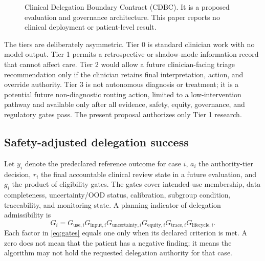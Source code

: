 \documentclass[conference]{IEEEtran}
\begin{document}
\begin{figure}[t]
\centering
{}
\caption{Clinical Delegation Boundary Contract (CDBC). It is a proposed evaluation and governance architecture. This paper reports no clinical deployment or patient-level result.}
\label{fig:cdbc}
\end{figure}

The tiers are deliberately asymmetric. Tier 0 is standard clinician work with no model output. Tier 1 permits a retrospective or shadow-mode information record that cannot affect care. Tier 2 would allow a future clinician-facing triage recommendation only if the clinician retains final interpretation, action, and override authority. Tier 3 is not autonomous diagnosis or treatment; it is a potential future non-diagnostic routing action, limited to a low-intervention pathway and available only after all evidence, safety, equity, governance, and regulatory gates pass. The present proposal authorizes only Tier 1 research.

\subsection{Safety-adjusted delegation success}

Let $y_i$ denote the predeclared reference outcome for case $i$, $a_i$ the authority-tier decision, $r_i$ the final accountable clinical review state in a future evaluation, and $g_i$ the product of eligibility gates. The gates cover intended-use membership, data completeness, uncertainty/OOD status, calibration, subgroup condition, traceability, and monitoring state. A planning indicator of delegation admissibility is
\begin{equation}
G_i=G_{\mathrm{use},i}G_{\mathrm{input},i}G_{\mathrm{uncertainty},i}G_{\mathrm{equity},i}G_{\mathrm{trace},i}G_{\mathrm{lifecycle},i}.
\label{eq:gates}
\end{equation}
Each factor in \eqref{eq:gates} equals one only when its declared criterion is met. A zero does not mean that the patient has a negative finding; it means the algorithm may not hold the requested delegation authority for that case.
\end{document}
